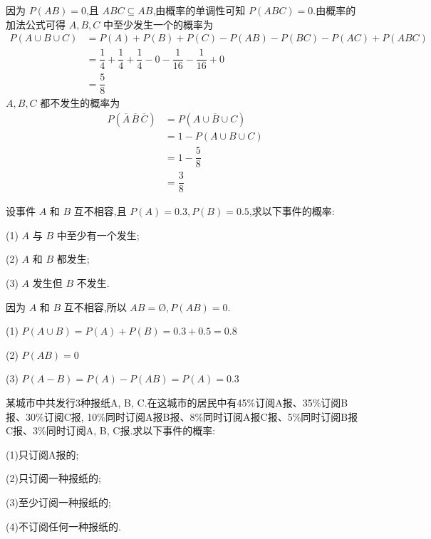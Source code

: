 \begin{solution}
    因为 $P(AB) = 0$,且 $ABC \subseteq AB$,由概率的单调性可知 $P(ABC) = 0$.由概率的加法公式可得 $A,B,C$ 中至少发生一个的概率为
    $$
    \begin{aligned}
        P(A \cup B \cup C) &= P(A) + P(B) + P(C) - P(AB) - P(BC) - P(AC) + P(ABC) \\
        &= \dfrac{1}{4} + \dfrac{1}{4} + \dfrac{1}{4} - 0 - \dfrac{1}{16} - \dfrac{1}{16} + 0 \\
        &= \dfrac{5}{8}
    \end{aligned}
    $$
    $A,B,C$ 都不发生的概率为
    $$
    \begin{aligned}
        P(\overline{A} \, \overline{B} \, \overline{C}) &= P(\overline{A \cup B \cup C}) \\
        &= 1 - P(A \cup B \cup C) \\
        &= 1 - \dfrac{5}{8} \\
        &= \dfrac{3}{8}
    \end{aligned}
    $$
\end{solution}

\question 设事件 $A$ 和 $B$ 互不相容,且 $P(A)=0.3, P(B)=0.5$,求以下事件的概率:

(1) $A$ 与 $B$ 中至少有一个发生;

(2) $A$ 和 $B$ 都发生;

(3) $A$ 发生但 $B$ 不发生.

\begin{solution}
    因为 $A$ 和 $B$ 互不相容,所以 $AB = \text{\O}, P(AB)=0$.

    (1) $P(A \cup B) = P(A) + P(B) = 0.3+0.5 = 0.8$

    (2) $P(AB) = 0$

    (3) $P(A-B) = P(A) - P(AB) = P(A) = 0.3$
\end{solution}

\question 某城市中共发行3种报纸A, B, C.在这城市的居民中有45\%订阅A报、35\%订阅B报、30\%订阅C报, 10\%同时订阅A报B报、8\%同时订阅A报C报、5\%同时订阅B报C报、3\%同时订阅A, B, C报.求以下事件的概率:

(1)只订阅A报的;

(2)只订阅一种报纸的;

(3)至少订阅一种报纸的;

(4)不订阅任何一种报纸的.

